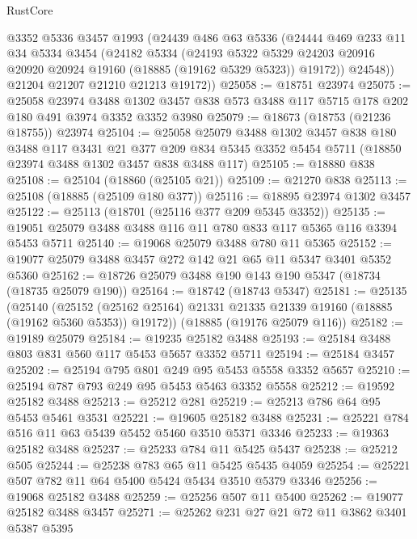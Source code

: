 \begin{lexlean}{RustCore}
\begin{coremodule}
        @3352
        @5336
        @3457
        @1993
        (@24439
          @486
          @63
          @5336
          (@24444
            @469
            @233
            @11
            @34
            @5334
            @3454
            (@24182
              @5334
              (@24193
                @5322
                @5329
                @24203
                @20916
                @20920
                @20924
                @19160
                (@18885 (@19162 @5329 @5323))
                @19172))
            @24548))
        @21204
        @21207
        @21210
        @21213
        @19172))
@25058 := @18751 @23974
@25075 := @25058
    @23974
    @3488
    @1302
    @3457
    @838
    @573
    @3488
    @117
    @5715
    @178
    @202
    @180
    @491
    @3974
    @3352
    @3352
    @3980
@25079 := @18673 (@18753 (@21236 @18755)) @23974
@25104 := @25058
    @25079
    @3488
    @1302
    @3457
    @838
    @180
    @3488
    @117
    @3431
    @21
    @377
    @209
    @834
    @5345
    @3352
    @5454
    @5711
    (@18850 @23974 @3488 @1302 @3457 @838 @3488 @117)
@25105 := @18880 @838
@25108 := @25104 (@18860 (@25105 @21))
@25109 := @21270 @838
@25113 := @25108 (@18885 (@25109 @180 @377))
@25116 := @18895 @23974 @1302 @3457
@25122 := @25113 (@18701 (@25116 @377 @209 @5345 @3352))
@25135 := @19051 @25079 @3488 @3488 @116 @11 @780 @833 @117 @5365 @116 @3394 @5453 @5711
@25140 := @19068 @25079 @3488 @780 @11 @5365
@25152 := @19077 @25079 @3488 @3457 @272 @142 @21 @65 @11 @5347 @3401 @5352 @5360
@25162 := @18726 @25079 @3488 @190 @143 @190 @5347 (@18734 (@18735 @25079 @190))
@25164 := @18742 (@18743 @5347)
@25181 := @25135
    (@25140
      (@25152 (@25162 @25164) @21331 @21335 @21339 @19160 (@18885 (@19162 @5360 @5353)) @19172))
    (@18885 (@19176 @25079 @116))
@25182 := @19189 @25079
@25184 := @19235 @25182 @3488
@25193 := @25184 @3488 @803 @831 @560 @117 @5453 @5657 @3352 @5711
@25194 := @25184 @3457
@25202 := @25194 @795 @801 @249 @95 @5453 @5558 @3352 @5657
@25210 := @25194 @787 @793 @249 @95 @5453 @5463 @3352 @5558
@25212 := @19592 @25182 @3488
@25213 := @25212 @281
@25219 := @25213 @786 @64 @95 @5453 @5461 @3531
@25221 := @19605 @25182 @3488
@25231 := @25221 @784 @516 @11 @63 @5439 @5452 @5460 @3510 @5371 @3346
@25233 := @19363 @25182 @3488
@25237 := @25233 @784 @11 @5425 @5437
@25238 := @25212 @505
@25244 := @25238 @783 @65 @11 @5425 @5435 @4059
@25254 := @25221 @507 @782 @11 @64 @5400 @5424 @5434 @3510 @5379 @3346
@25256 := @19068 @25182 @3488
@25259 := @25256 @507 @11 @5400
@25262 := @19077 @25182 @3488 @3457
@25271 := @25262 @231 @27 @21 @72 @11 @3862 @3401 @5387 @5395

\end{coremodule}
\end{lexlean}
